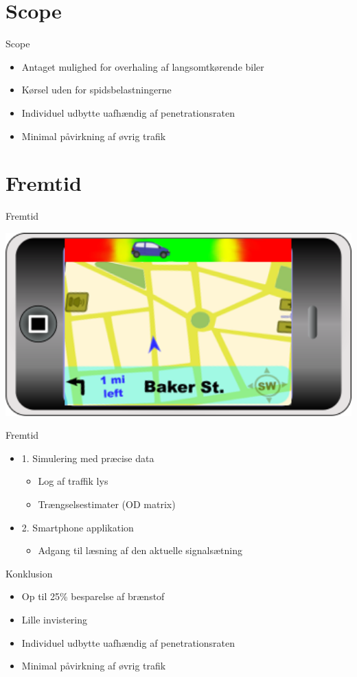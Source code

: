 \section{Scope}
\begin{frame}{Scope}
\begin{itemize}
\item Antaget mulighed for overhaling af langsomtkørende biler

\item Kørsel uden for spidsbelastningerne
\item Individuel udbytte uafhændig af penetrationsraten
\item Minimal påvirkning af øvrig trafik
\end{itemize}
\end{frame}

\section{Fremtid}
\begin{frame}{Fremtid}


\begin{center}
\includegraphics[width=1\textwidth]{images/product.png}
\end{center}
\end{frame}

\begin{frame}{Fremtid}
\begin{itemize}
\item 1. Simulering med præcise data
	\begin{itemize}
	\item Log af traffik lys
	\item Trængselsestimater (OD matrix)
	\end{itemize}
\item 2. Smartphone applikation
	\begin{itemize}
	\item Adgang til læsning af den aktuelle signalsætning
	\end{itemize}
\end{itemize}

\end{frame}

\begin{frame}{Konklusion}

\begin{itemize}
\item Op til 25\% besparelse af brænstof
\item Lille invistering
\item Individuel udbytte uafhændig af penetrationsraten
\item Minimal påvirkning af øvrig trafik
\end{itemize}
\end{frame}
